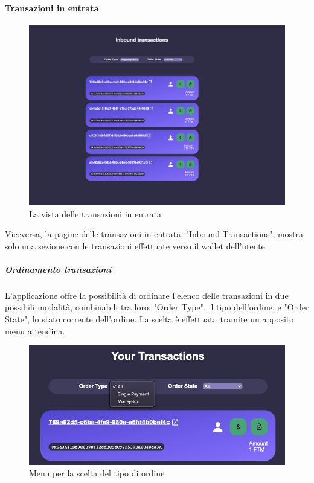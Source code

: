                 \paragraph{Transazioni in entrata}

                \begin{figure}[H]
                    \centering
                    \includegraphics[scale=0.4]{immagini/Transaction/inboundtransactions.jpg}
                    \caption{La vista delle transazioni in entrata}
                \end{figure}

                Viceversa, la pagine delle transazioni in entrata, "Inbound Transactions", mostra solo una sezione con le transazioni effettuate verso il wallet dell'utente.

                \subparagraph{Ordinamento transazioni}

                L'applicazione offre la possibilità di ordinare l'elenco delle transazioni in due possibili modalità, combinabili tra loro: 
                "Order Type", il tipo dell'ordine, e "Order State", lo stato corrente dell'ordine.
                La scelta è effettuata tramite un apposito menu a tendina.

                \begin{figure}[H]
                    \centering
                    \includegraphics[scale=0.4]{immagini/Transaction/ordertype.jpg}
                \caption{Menu per la scelta del tipo di ordine}
                \end{figure}

